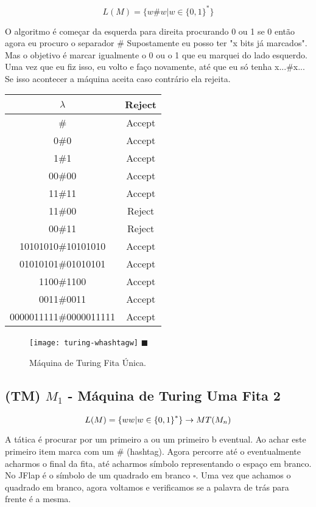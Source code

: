 \documentclass[12pt, a4paper]{article}
\begin{document}
$$ L(M)= \lbrace w \# w \vert w \in  {\lbrace 0,1 \rbrace}^* \rbrace $$

\qquad O algoritmo é começar da esquerda para direita procurando 0 ou 1 se 0 então agora eu procuro o separador \# Supostamente eu posso ter "x bits já marcados". Mas o objetivo é marcar igualmente o 0 ou o 1 que eu marquei do lado esquerdo. Uma vez que eu fiz isso, eu volto e faço novamente, até que eu só tenha x...\#x... Se isso acontecer a máquina aceita caso contrário ela rejeita.


\begin{tabular}{|c|c|}
  \hline $\lambda$              & Reject \\
  \hline \#                     & Accept \\
  \hline 0\#0                   & Accept \\
  \hline 1\#1                   & Accept \\
  \hline 00\#00                 & Accept \\
  \hline 11\#11                 & Accept \\
  \hline 11\#00                 & Reject \\
  \hline 00\#11                 & Reject \\
  \hline 10101010\#10101010     & Accept \\
  \hline 01010101\#01010101     & Accept \\
  \hline 1100\#1100             & Accept \\
  \hline 0011\#0011             & Accept \\
  \hline 0000011111\#0000011111 & Accept \\
  \hline
\end{tabular}

\begin{figure}[ht]
\centering
\texttt{[image: turing-whashtagw]} \flushright $\blacksquare$
\caption{Máquina de Turing Fita Única.}
\end{figure}

\pagebreak
\subsection{(TM) $M_1$ - Máquina de Turing Uma Fita 2}

$$ L(M)= \lbrace ww \vert w \in  {\lbrace 0,1 \rbrace}^* \rbrace \rightarrow MT \small (M_{n}) $$

\qquad A tática é procurar por um primeiro a ou um primeiro b eventual. Ao achar este primeiro item marca com um \# (hashtag). Agora percorre até o eventualmente acharmos o final da fita, até acharmos símbolo representando o espaço em branco. No JFlap é o símbolo de um quadrado em branco $\square$. Uma vez que achamos o quadrado em branco, agora voltamos e verificamos se a palavra de trás para frente é a mesma.
\end{document}
